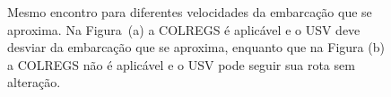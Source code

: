 \begin{figure}
    \caption{Mesmo encontro para diferentes velocidades da embarcação que se aproxima. Na Figura~(a) a COLREGS é aplicável e o USV deve desviar da embarcação que se aproxima, enquanto que na Figura (b) a COLREGS não é aplicável e o USV pode seguir sua rota sem alteração.}
    \label{fig:Kuwata2014_colregsInterpretation}
    \end{figure}